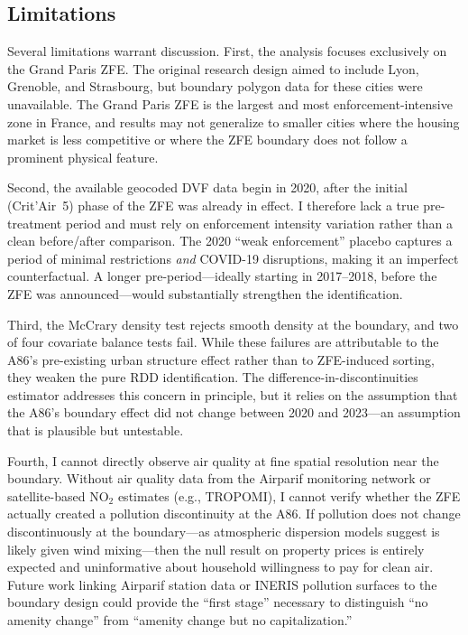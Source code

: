 \documentclass[12pt]{article}
\begin{document}
\subsection{Limitations}

Several limitations warrant discussion. First, the analysis focuses exclusively on the Grand Paris ZFE. The original research design aimed to include Lyon, Grenoble, and Strasbourg, but boundary polygon data for these cities were unavailable. The Grand Paris ZFE is the largest and most enforcement-intensive zone in France, and results may not generalize to smaller cities where the housing market is less competitive or where the ZFE boundary does not follow a prominent physical feature.

Second, the available geocoded DVF data begin in 2020, after the initial (Crit'Air~5) phase of the ZFE was already in effect. I therefore lack a true pre-treatment period and must rely on enforcement intensity variation rather than a clean before/after comparison. The 2020 ``weak enforcement'' placebo captures a period of minimal restrictions \textit{and} COVID-19 disruptions, making it an imperfect counterfactual. A longer pre-period---ideally starting in 2017--2018, before the ZFE was announced---would substantially strengthen the identification.

Third, the McCrary density test rejects smooth density at the boundary, and two of four covariate balance tests fail. While these failures are attributable to the A86's pre-existing urban structure effect rather than to ZFE-induced sorting, they weaken the pure RDD identification. The difference-in-discontinuities estimator addresses this concern in principle, but it relies on the assumption that the A86's boundary effect did not change between 2020 and 2023---an assumption that is plausible but untestable.

Fourth, I cannot directly observe air quality at fine spatial resolution near the boundary. Without air quality data from the Airparif monitoring network or satellite-based NO$_2$ estimates (e.g., TROPOMI), I cannot verify whether the ZFE actually created a pollution discontinuity at the A86. If pollution does not change discontinuously at the boundary---as atmospheric dispersion models suggest is likely given wind mixing---then the null result on property prices is entirely expected and uninformative about household willingness to pay for clean air. Future work linking Airparif station data or INERIS pollution surfaces to the boundary design could provide the ``first stage'' necessary to distinguish ``no amenity change'' from ``amenity change but no capitalization.''
\end{document}
